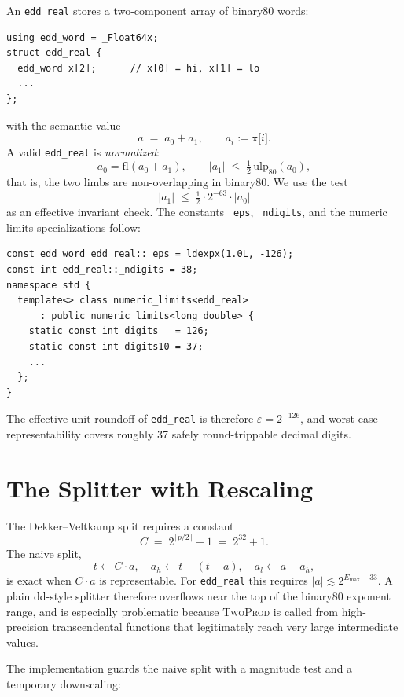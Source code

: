 \documentclass[11pt,a4paper]{article}
\begin{document}
An \texttt{edd\_real} stores a two-component array of binary80
words:
\begin{lstlisting}
using edd_word = _Float64x;
struct edd_real {
  edd_word x[2];      // x[0] = hi, x[1] = lo
  ...
};
\end{lstlisting}
with the semantic value
\[
  a \;=\; a_0 + a_1, \qquad a_i := \texttt{x[$i$]}.
\]
A valid \texttt{edd\_real} is \emph{normalized}:
\[
  a_0 = \mathrm{fl}(a_0 + a_1), \qquad
  |a_1| \;\le\; \tfrac{1}{2}\,\mathrm{ulp}_{80}(a_0),
\]
that is, the two limbs are non-overlapping in binary80.  We use
the test
\[
  |a_1| \;\le\; \tfrac{1}{2} \cdot 2^{-63} \cdot |a_0|
\]
as an effective invariant check.  The constants \texttt{\_eps},
\texttt{\_ndigits}, and the numeric limits specializations follow:
\begin{lstlisting}
const edd_word edd_real::_eps = ldexpx(1.0L, -126);
const int edd_real::_ndigits = 38;
namespace std {
  template<> class numeric_limits<edd_real>
      : public numeric_limits<long double> {
    static const int digits   = 126;
    static const int digits10 = 37;
    ...
  };
}
\end{lstlisting}
The effective unit roundoff of \texttt{edd\_real} is therefore
$\varepsilon = 2^{-126}$, and worst-case representability covers
roughly 37 safely round-trippable decimal digits.

\section{The Splitter with Rescaling}
\label{sec:split}

The Dekker--Veltkamp split requires a constant
\[
  C \;=\; 2^{\lceil p/2 \rceil} + 1 \;=\; 2^{32} + 1.
\]
The naive split,
\[
  t \gets C \cdot a, \quad
  a_h \gets t - (t - a), \quad
  a_l \gets a - a_h,
\]
is exact when $C \cdot a$ is representable.  For
\texttt{edd\_real} this requires $|a| \lesssim 2^{E_{\max} - 33}$.
A plain dd-style splitter therefore overflows near the top of the
binary80 exponent range, and is especially problematic because
\textsc{TwoProd} is called from high-precision transcendental
functions that legitimately reach very large intermediate values.

The implementation guards the naive split with a magnitude test
and a temporary downscaling:
\end{document}
